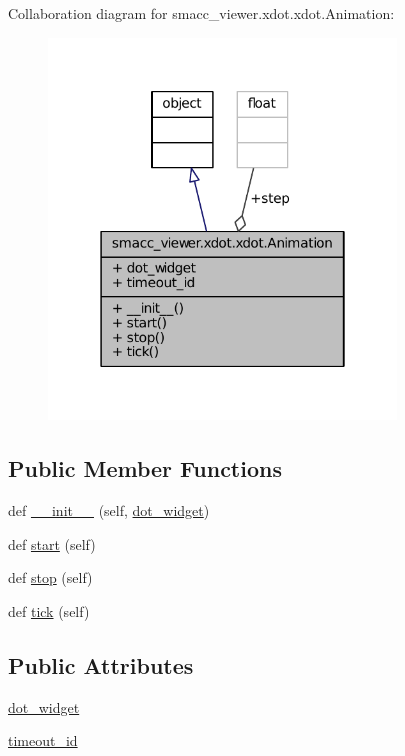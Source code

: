 Collaboration diagram for smacc\+\_\+viewer.\+xdot.\+xdot.\+Animation\+:
\nopagebreak
\begin{figure}[H]
\begin{center}
\leavevmode
\includegraphics[width=262pt]{classsmacc__viewer_1_1xdot_1_1xdot_1_1Animation__coll__graph}
\end{center}
\end{figure}
\subsection*{Public Member Functions}
\begin{DoxyCompactItemize}
\item 
def \hyperlink{classsmacc__viewer_1_1xdot_1_1xdot_1_1Animation_a4114be9139756881f33d5e803bb9b8f8}{\+\_\+\+\_\+init\+\_\+\+\_\+} (self, \hyperlink{classsmacc__viewer_1_1xdot_1_1xdot_1_1Animation_a0fca25f51eb80a7ba49233a0729ab955}{dot\+\_\+widget})
\item 
def \hyperlink{classsmacc__viewer_1_1xdot_1_1xdot_1_1Animation_abfce9139a365decfda6a6c04d1d939f9}{start} (self)
\item 
def \hyperlink{classsmacc__viewer_1_1xdot_1_1xdot_1_1Animation_a1cec902e320f3f91a9b460a0db751198}{stop} (self)
\item 
def \hyperlink{classsmacc__viewer_1_1xdot_1_1xdot_1_1Animation_abe947b684db8e263f38c3f4e3a5831b7}{tick} (self)
\end{DoxyCompactItemize}
\subsection*{Public Attributes}
\begin{DoxyCompactItemize}
\item 
\hyperlink{classsmacc__viewer_1_1xdot_1_1xdot_1_1Animation_a0fca25f51eb80a7ba49233a0729ab955}{dot\+\_\+widget}
\item 
\hyperlink{classsmacc__viewer_1_1xdot_1_1xdot_1_1Animation_a34df6d9513d5da72a6b662e0f7536d5b}{timeout\+\_\+id}
\end{DoxyCompactItemize}
